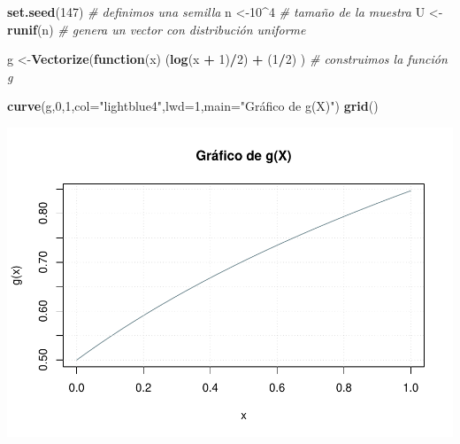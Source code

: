 \documentclass[
]{article}
\newenvironment{Shaded}{\begin{snugshade}}{\end{snugshade}}
\newcommand{\AttributeTok}[1]{\textcolor[rgb]{0.13,0.29,0.53}{#1}}
\newcommand{\CommentTok}[1]{\textcolor[rgb]{0.56,0.35,0.01}{\textit{#1}}}
\newcommand{\ControlFlowTok}[1]{\textcolor[rgb]{0.13,0.29,0.53}{\textbf{#1}}}
\newcommand{\DecValTok}[1]{\textcolor[rgb]{0.00,0.00,0.81}{#1}}
\newcommand{\FunctionTok}[1]{\textcolor[rgb]{0.13,0.29,0.53}{\textbf{#1}}}
\newcommand{\NormalTok}[1]{#1}
\newcommand{\OtherTok}[1]{\textcolor[rgb]{0.56,0.35,0.01}{#1}}
\newcommand{\SpecialCharTok}[1]{\textcolor[rgb]{0.81,0.36,0.00}{\textbf{#1}}}
\newcommand{\StringTok}[1]{\textcolor[rgb]{0.31,0.60,0.02}{#1}}
\begin{document}
\begin{Shaded}
\begin{Highlighting}[]
\FunctionTok{set.seed}\NormalTok{(}\DecValTok{147}\NormalTok{) }\CommentTok{\# definimos una semilla}
\NormalTok{n }\OtherTok{\textless{}{-}}\DecValTok{10}\SpecialCharTok{\^{}}\DecValTok{4} \CommentTok{\# tamaño de la muestra}
\NormalTok{U }\OtherTok{\textless{}{-}}\FunctionTok{runif}\NormalTok{(n) }\CommentTok{\# genera un vector con distribución uniforme}

\NormalTok{g }\OtherTok{\textless{}{-}}\FunctionTok{Vectorize}\NormalTok{(}\ControlFlowTok{function}\NormalTok{(x) (}\FunctionTok{log}\NormalTok{(x }\SpecialCharTok{+} \DecValTok{1}\NormalTok{)}\SpecialCharTok{/}\DecValTok{2}\NormalTok{) }\SpecialCharTok{+}\NormalTok{ (}\DecValTok{1}\SpecialCharTok{/}\DecValTok{2}\NormalTok{) ) }\CommentTok{\# construimos la función g }

\FunctionTok{curve}\NormalTok{(g,}\DecValTok{0}\NormalTok{,}\DecValTok{1}\NormalTok{,}\AttributeTok{col=}\StringTok{"lightblue4"}\NormalTok{,}\AttributeTok{lwd=}\DecValTok{1}\NormalTok{,}\AttributeTok{main=}\StringTok{"Gráfico de g(X)"}\NormalTok{)}
\FunctionTok{grid}\NormalTok{()  }
\end{Highlighting}
\end{Shaded}

\includegraphics{tarea2_files/figure-latex/unnamed-chunk-1-1.pdf}
\end{document}
